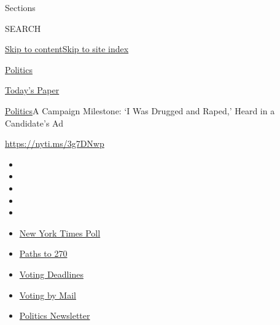 Sections

SEARCH

\protect\hyperlink{site-content}{Skip to
content}\protect\hyperlink{site-index}{Skip to site index}

\href{https://www.nytimes3xbfgragh.onion/section/politics}{Politics}

\href{https://myaccount.nytimes3xbfgragh.onion/auth/login?response_type=cookie\&client_id=vi}{}

\href{https://www.nytimes3xbfgragh.onion/section/todayspaper}{Today's
Paper}

\href{/section/politics}{Politics}\textbar{}A Campaign Milestone: `I Was
Drugged and Raped,' Heard in a Candidate's Ad

\url{https://nyti.ms/3g7DNwp}

\begin{itemize}
\item
\item
\item
\item
\item
\end{itemize}

\begin{itemize}
\item
  \href{https://www.nytimes3xbfgragh.onion/2020/09/12/us/politics/biden-trump-poll-wisconsin-minnesota.html?action=click\&pgtype=Article\&state=default\&region=TOP_BANNER\&context=storylines_menu}{New
  York Times Poll}
\item
  \href{https://www.nytimes3xbfgragh.onion/interactive/2020/us/elections/election-states-biden-trump.html?action=click\&pgtype=Article\&state=default\&region=TOP_BANNER\&context=storylines_menu}{Paths
  to 270}
\item
  \href{https://www.nytimes3xbfgragh.onion/interactive/2019/us/elections/2020-presidential-election-calendar.html?action=click\&pgtype=Article\&state=default\&region=TOP_BANNER\&context=storylines_menu}{Voting
  Deadlines}
\item
  \href{https://www.nytimes3xbfgragh.onion/interactive/2020/08/31/us/politics/vote-by-mail-deadlines.html?action=click\&pgtype=Article\&state=default\&region=TOP_BANNER\&context=storylines_menu}{Voting
  by Mail}
\item
  \href{https://www.nytimes3xbfgragh.onion/newsletters/politics?action=click\&pgtype=Article\&state=default\&region=TOP_BANNER\&context=storylines_menu}{Politics
  Newsletter}
\end{itemize}

